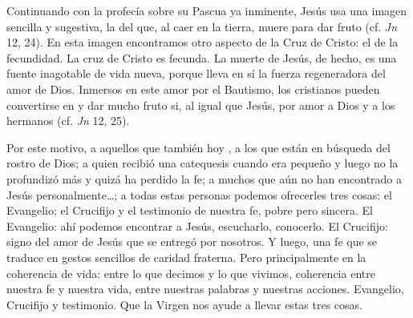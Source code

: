 \begin{body}
Continuando con la profecía sobre su Pascua ya inminente, Jesús usa una imagen sencilla y sugestiva, la del  que, al caer en la tierra, muere para dar fruto (cf. \textit{Jn} 12, 24). En esta imagen encontramos otro aspecto de la Cruz de Cristo: el de la fecundidad. La cruz de Cristo es fecunda. La muerte de Jesús, de hecho, es una fuente inagotable de vida nueva, porque lleva en sí la fuerza regeneradora del amor de Dios. Inmersos en este amor por el Bautismo, los cristianos pueden convertirse en  y dar mucho fruto si, al igual que Jesús,  por amor a Dios y a los hermanos (cf. \textit{Jn} 12, 25).

Por este motivo, a aquellos que también hoy , a los que están en búsqueda del rostro de Dios; a quien recibió una catequesis cuando era pequeño y luego no la profundizó más y quizá ha perdido la fe; a muchos que aún no han encontrado a Jesús personalmente\ldots; a todas estas personas podemos ofrecerles tres cosas: el Evangelio; el Crucifijo y el testimonio de nuestra fe, pobre pero sincera. El Evangelio: ahí podemos encontrar a Jesús, escucharlo, conocerlo. El Crucifijo: signo del amor de Jesús que se entregó por nosotros. Y luego, una fe que se traduce en gestos sencillos de caridad fraterna. Pero principalmente en la coherencia de vida: entre lo que decimos y lo que vivimos, coherencia entre nuestra fe y nuestra vida, entre nuestras palabras y nuestras acciones. Evangelio, Crucifijo y testimonio. Que la Virgen nos ayude a llevar estas tres cosas.
\end{body}

\label{b2-03-05-2015A}

